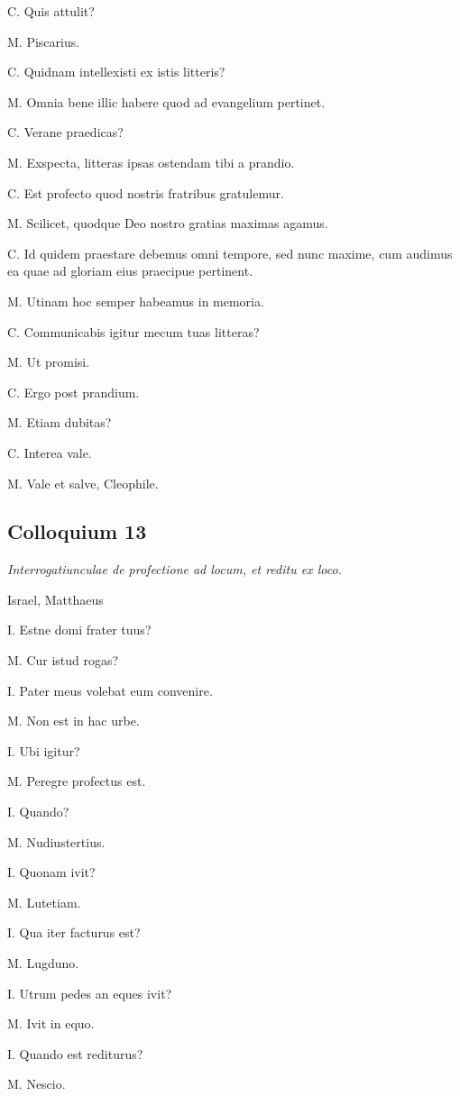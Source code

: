 \documentclass{article}
\begin{document}
C. Quis attulit?

M. Piscarius. 

C. Quidnam intellexisti ex istis litteris?

M. Omnia bene illic habere quod ad evangelium pertinet. 

C. Verane praedicas?

M. Exspecta, litteras ipsas ostendam tibi a prandio. 

C. Est profecto quod nostris fratribus gratulemur. 

M. Scilicet, quodque Deo nostro gratias maximas agamus. 

C. Id quidem praestare debemus omni tempore, sed nunc maxime, cum audimus ea quae ad gloriam eius praecipue pertinent. 

M. Utinam hoc semper habeamus in memoria. 

C. Communicabis igitur mecum tuas litteras?

M. Ut promisi. 

C. Ergo post prandium. 

M. Etiam dubitas?

C. Interea vale. 

M. Vale et salve, Cleophile.

\subsection{Colloquium 13}
\emph{Interrogatiunculae de profectione ad locum, et reditu ex loco.}

Israel, Matthaeus

I. Estne domi frater tuus?

M. Cur istud rogas?

I. Pater meus volebat eum convenire. 

M. Non est in hac urbe. 

I. Ubi igitur?

M. Peregre profectus est. 

I. Quando?

M. Nudiustertius. 

I. Quonam ivit?

M. Lutetiam. 

I. Qua iter facturus est?

M. Lugduno. 

I. Utrum pedes an eques ivit?

M. Ivit in equo. 

I. Quando est rediturus?

M. Nescio. 
\end{document}
